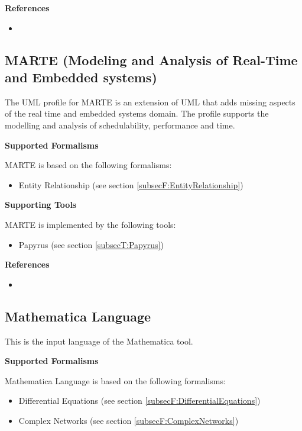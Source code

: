 \textbf{References}
\begin{itemize}
	
\item {}
\end{itemize}



\subsection{MARTE (Modeling and Analysis of Real-Time and Embedded systems)}
\label{subsecL:MARTE}


The UML profile for MARTE is an extension of UML that adds missing aspects of the real time and embedded systems domain. The profile supports the modelling and analysis of schedulability, performance and time.

\textbf{Supported Formalisms}

MARTE is based on the following formalisms:
\begin{itemize}
	\item Entity Relationship (see section \ref{subsecF:EntityRelationship})
\end{itemize}


\textbf{Supporting Tools}

MARTE is implemented by the following tools:
\begin{itemize}
	\item Papyrus (see section \ref{subsecT:Papyrus})
\end{itemize}


\textbf{References}
\begin{itemize}
	
\item {}
\end{itemize}



\subsection{Mathematica Language}
\label{subsecL:MathematicaLanguage}


This is the input language of the Mathematica tool.

\textbf{Supported Formalisms}

Mathematica Language is based on the following formalisms:
\begin{itemize}
	\item Differential Equations (see section \ref{subsecF:DifferentialEquations})
	\item Complex Networks (see section \ref{subsecF:ComplexNetworks})
\end{itemize}


